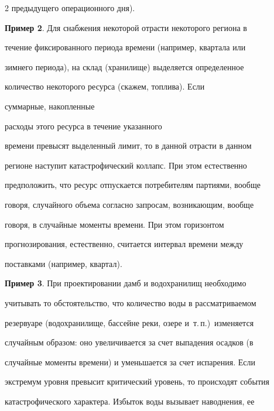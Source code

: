 \begin{multicols}{2}
предыду\-ще\-го операционного дня).





\medskip





\noindent


\textbf{Пример 2}. Для снабжения некоторой отрасти некоторого региона в


течение фиксированного периода времени (например, квартала или


зимнего периода), на склад (хранилище) выделяется определенное


количество некоторого ресурса (скажем, топлива). Если {\it


суммарные, накопленные} расходы этого ресурса в течение указанного


времени превысят выделенный лимит, то в данной отрасти в данном


регионе наступит катастрофический коллапс. При этом естественно


предположить, что ресурс отпускается потребителям партиями, вообще


говоря, случайного объема согласно запросам, возникающим, вообще


говоря, в случайные моменты времени. При этом горизонтом


прогнозирования, естественно, считается интервал времени между


поставками (например, квартал).





\medskip





\noindent


\textbf{Пример 3}. При проектировании дамб и водохранилищ необходимо


учитывать то обстоятельство, что количество воды в рассматриваемом


резервуаре (водохранилище, бассейне реки, озере и~т.\,п.)\ изменяется


случайным образом: оно увеличивается за счет выпадения осадков (в


случайные моменты времени) и уменьшается за счет испарения. Если


экстремум уровня превысит критический уровень, то происходят события


катастрофического характера. Избыток воды вызывает наводнения, ее



\end{multicols}
